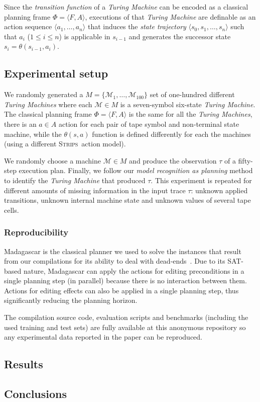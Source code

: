 \documentclass[letterpaper]{article} %
\newcommand{\tup}[1]{{\langle #1 \rangle}}
\newcommand{\strips}{\textsc{Strips}}     %
\begin{document}
Since the {\em transition function} of a {\em Turing Machine} can be encoded as a classical planning frame $\Phi=\tup{F,A}$, executions of that {\em Turing Machine} are definable as an action sequence $\tup{a_1, \ldots, a_n}$ that induces the {\em state trajectory} $\tup{s_0, s_1, \ldots, s_n}$ such that $a_i$ ({\small $1\leq i\leq n$}) is applicable in $s_{i-1}$ and generates the successor state $s_i=\theta(s_{i-1},a_i)$.

\subsection{Experimental setup}
We randomly generated a $M=\{\mathcal{M}_1,\ldots,\mathcal{M}_{100}\}$ set of one-hundred different {\em Turing Machines} where each $\mathcal{M}\in M$ is a seven-symbol six-state {\em Turing Machine}. The classical planning frame $\Phi=\tup{F,A}$ is the same for all the {\em Turing Machines}, there is an $a\in A$ action for each pair of tape symbol and non-terminal state machine, while the $\theta(s,a)$ function is defined differently for each the machines (using a different \strips\ action model).

We randomly choose a machine $\mathcal{M}\in M$ and produce the observation $\tau$ of a fifty-step execution plan. Finally, we follow our {\em model recognition as planning} method to identify the {\em Turing Machine} that produced $\tau$. This experiment is repeated for different amounts of missing information in the input trace $\tau$: unknown applied transitions, unknown internal machine state and unknown values of several tape cells.

\subsubsection{Reproducibility}
{\sc Madagascar} is the classical planner we used to solve the instances that result from our compilations for its ability to deal with dead-ends~\cite{rintanen2014madagascar}. Due to its SAT-based nature, {\sc Madagascar} can apply the actions for editing preconditions in a single planning step (in parallel) because there is no interaction between them. Actions for editing effects can also be applied in a single planning step, thus significantly reducing the planning horizon.

The compilation source code, evaluation scripts and benchmarks (including the used training and test sets) are fully available at this anonymous repository {\em } so any experimental data reported in the paper can be reproduced.

\subsection{Results}

\subsection{Conclusions}
\label{sec:conclussions}





\end{document}
